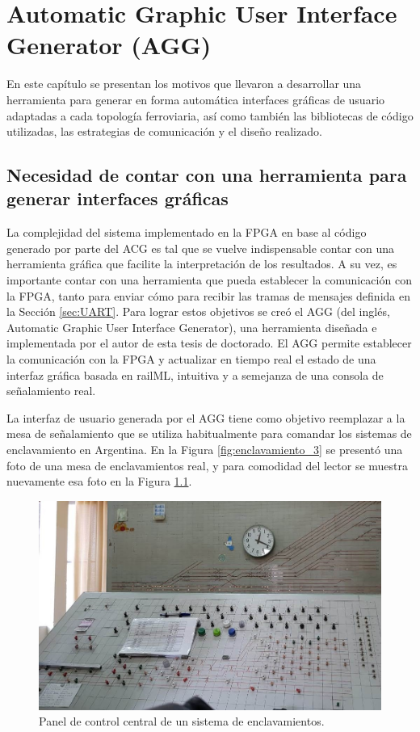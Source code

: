 \chapter{Automatic Graphic User Interface Generator (AGG)}
	\label{sec:AGG}
	
	En este capítulo se presentan los motivos que llevaron a desarrollar una herramienta para generar en forma automática interfaces gráficas de usuario adaptadas a cada topología ferroviaria, así como también las bibliotecas de código utilizadas, las estrategias de comunicación y el diseño realizado.
	
	\section{Necesidad de contar con una herramienta para generar interfaces gráficas}
	
	La complejidad del sistema implementado en la FPGA en base al código generado por parte del ACG es tal que se vuelve indispensable contar con una herramienta gráfica que facilite la interpretación de los resultados. A su vez, es importante contar con una herramienta que pueda establecer la comunicación con la FPGA, tanto para enviar cómo para recibir las tramas de mensajes definida en la Sección \ref{sec:UART}. Para lograr estos objetivos se creó el AGG (del inglés, Automatic Graphic User Interface Generator), una herramienta diseñada e implementada por el autor de esta tesis de doctorado. El AGG permite establecer la comunicación con la FPGA y actualizar en tiempo real el estado de una interfaz gráfica basada en railML, intuitiva y a semejanza de una consola de señalamiento real.
	
	La interfaz de usuario generada por el AGG tiene como objetivo reemplazar a la mesa de señalamiento que se utiliza habitualmente para comandar los sistemas de enclavamiento en Argentina. En la Figura \ref{fig:enclavamiento_3} se presentó una foto de una mesa de enclavamientos real, y para comodidad del lector se muestra nuevamente esa foto en la Figura \ref{fig:enclavamiento_3_nueva}.
	
	\begin{figure}[H]
		\centering
		\includegraphics[width=1\textwidth]{Figuras/llavallol.jpg}
		\centering\caption{Panel de control central de un sistema de enclavamientos.}
		\label{fig:enclavamiento_3_nueva}
	\end{figure}
	
